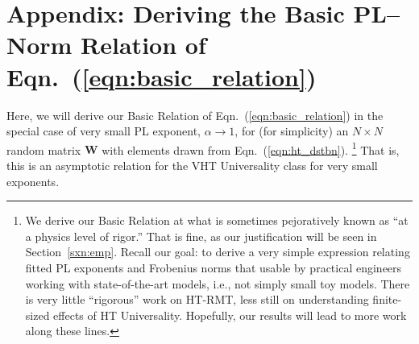 \newpage

\section{Appendix: Deriving the Basic PL--Norm Relation of Eqn.~(\ref{eqn:basic_relation})}
\label{sxn:appendix-justify_basic_pl_norm_relation}

Here, we will derive our Basic Relation of Eqn.~(\ref{eqn:basic_relation}) in the special case of very small PL exponent, $\alpha \rightarrow 1$,
for (for simplicity) an $N \times N$ random matrix $\mathbf{W}$ with elements drawn from Eqn.~(\ref{eqn:ht_dstbn}).%
\footnote{We derive our Basic Relation at what is sometimes pejoratively known as ``at a physics level of rigor.''  That is fine, as our justification will be seen in Section~\ref{sxn:emp}.  Recall our goal: to derive a very simple expression relating fitted PL exponents and Frobenius norms that usable by practical engineers working with state-of-the-art models, i.e., not simply small toy models.  There is very little ``rigorous'' work on HT-RMT, less still on understanding finite-sized effects of HT Universality.  Hopefully, our results will lead to more work along these lines.  }
That is, this is an asymptotic relation for the VHT Universality class for very small exponents.


